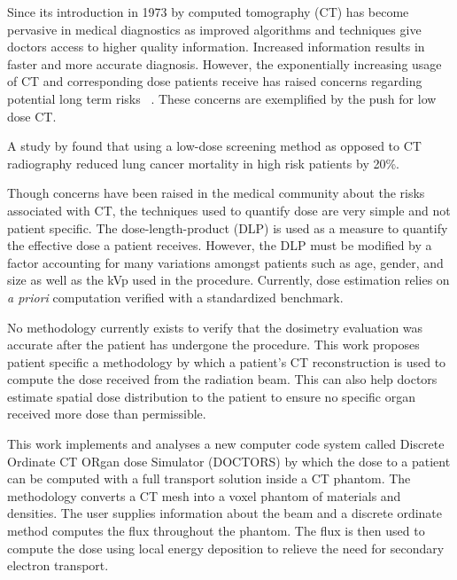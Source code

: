 

Since its introduction in 1973 by \citet{ref:hounsfieldg} computed tomography (CT) has become pervasive in medical diagnostics as improved algorithms and techniques give doctors access to higher quality information. Increased information results in faster and more accurate diagnosis. However, the exponentially increasing usage of CT and corresponding dose patients receive has raised concerns regarding potential long term risks~\citep{ref:brennerd} \citep{ref:einsteina1} \citep{ref:abramsh} \citep{ref:einsteina2} \citep{ref:mccolloughc} \citep{ref:yul}. These concerns are exemplified by the push for low dose CT.

A study by \citet{ref:kovalchiks} found that using a low-dose screening method as opposed to CT radiography reduced lung cancer mortality in high risk patients by 20\%. 

Though concerns have been raised in the medical community about the risks associated with CT, the techniques used to quantify dose are very simple and not patient specific. The dose-length-product (DLP) is used as a measure to quantify the effective dose a patient receives. However, the DLP must be modified by a factor accounting for many variations amongst patients such as age, gender, and size as well as the kVp used in the procedure. Currently, dose estimation relies on \textit{a priori} computation verified with a standardized benchmark. 

No methodology currently exists to verify that the dosimetry evaluation was accurate after the patient has undergone the procedure. This work proposes patient specific a methodology by which a patient's CT reconstruction is used to compute the dose received from the radiation beam. This can also help doctors estimate spatial dose distribution to the patient to ensure no specific organ received more dose than permissible.

This work implements and analyses a new computer code system called Discrete Ordinate CT ORgan dose Simulator (DOCTORS) by which the dose to a patient can be computed with a full transport solution inside a CT phantom. The methodology converts a CT mesh into a voxel phantom of materials and densities. The user supplies information about the beam and a discrete ordinate method computes the flux throughout the phantom. The flux is then used to compute the dose using local energy deposition to relieve the need for secondary electron transport.

